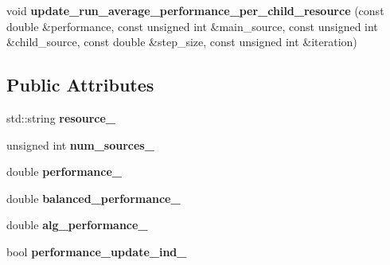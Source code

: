 \begin{DoxyCompactItemize}
\item 
\hypertarget{structStruct__PerformanceMonitoring_a797d2ddf9ac5543dbc8d1a1cc6a757ad}{void {\bfseries update\-\_\-run\-\_\-average\-\_\-performance\-\_\-per\-\_\-child\-\_\-resource} (const double \&performance, const unsigned int \&main\-\_\-source, const unsigned int \&child\-\_\-source, const double \&step\-\_\-size, const unsigned int \&iteration)}\label{structStruct__PerformanceMonitoring_a797d2ddf9ac5543dbc8d1a1cc6a757ad}

\end{DoxyCompactItemize}
\subsection*{Public Attributes}
\begin{DoxyCompactItemize}
\item 
\hypertarget{structStruct__PerformanceMonitoring_a4befcad39a937f6b5e700096c2c59db8}{std\-::string {\bfseries resource\-\_\-}}\label{structStruct__PerformanceMonitoring_a4befcad39a937f6b5e700096c2c59db8}

\item 
\hypertarget{structStruct__PerformanceMonitoring_a4511f5fefac78cf5e8af5328b9c4fd4e}{unsigned int {\bfseries num\-\_\-sources\-\_\-}}\label{structStruct__PerformanceMonitoring_a4511f5fefac78cf5e8af5328b9c4fd4e}

\item 
\hypertarget{structStruct__PerformanceMonitoring_a988731ba990b5c6b4ec504260de3f58e}{double {\bfseries performance\-\_\-}}\label{structStruct__PerformanceMonitoring_a988731ba990b5c6b4ec504260de3f58e}

\item 
\hypertarget{structStruct__PerformanceMonitoring_af0c1251314c796cae71ab26c207fc175}{double {\bfseries balanced\-\_\-performance\-\_\-}}\label{structStruct__PerformanceMonitoring_af0c1251314c796cae71ab26c207fc175}

\item 
\hypertarget{structStruct__PerformanceMonitoring_ae83002b76dac4f7250f1f5f85609b61c}{double {\bfseries alg\-\_\-performance\-\_\-}}\label{structStruct__PerformanceMonitoring_ae83002b76dac4f7250f1f5f85609b61c}

\item 
\hypertarget{structStruct__PerformanceMonitoring_ab31eba22d1c2c5035bdee635c8209f4c}{bool {\bfseries performance\-\_\-update\-\_\-ind\-\_\-}}\label{structStruct__PerformanceMonitoring_ab31eba22d1c2c5035bdee635c8209f4c}


\end{DoxyCompactItemize}
